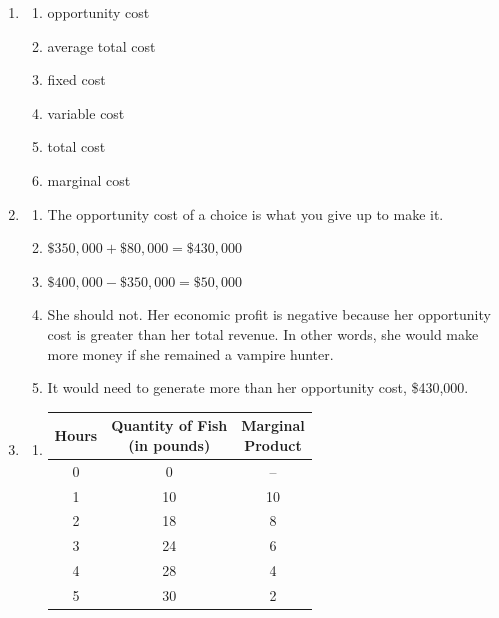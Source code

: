 \documentclass{article}
\begin{document}
\begin{enumerate}

\item

	\begin{enumerate}
	
	\item opportunity cost
	
	\item average total cost
	
	\item fixed cost
	
	\item variable cost
	
	\item total cost
	
	\item marginal cost
	
	\end{enumerate}
	
\item 

	\begin{enumerate}
	
	\item The opportunity cost of a choice is what you give up to make it.
	
	\item $\$350,000 + \$80,000 = \$430,000$
	
	\item $\$400,000 - \$350,000 = \$50,000$
	
	\item She should not. Her economic profit is negative because her opportunity cost is greater than her total revenue. In other words, she would make more money if she remained a vampire hunter. 
	
	\item It would need to generate more than her opportunity cost, \$430,000. 
	
	\end{enumerate}
	
\item

	\begin{enumerate}
	
	\item \phantom{x}
	
		\begin{center}
		\begin{tabular}{ c | c | c}
		\textbf{Hours} & \makecell{\textbf{Quantity of Fish}\\\textbf{(in pounds)}} & \makecell{\textbf{Marginal}\\ \textbf{Product}} \\
		\hline
		0 & 0 & -- \\
		1 & 10 & 10 \\
		2 & 18 & 8 \\
		3 & 24 & 6 \\
		4 & 28 & 4 \\
		5 & 30 & 2 \\
		\end{tabular}
		\end{center}
		

\end{enumerate}
\end{enumerate}
\end{document}
